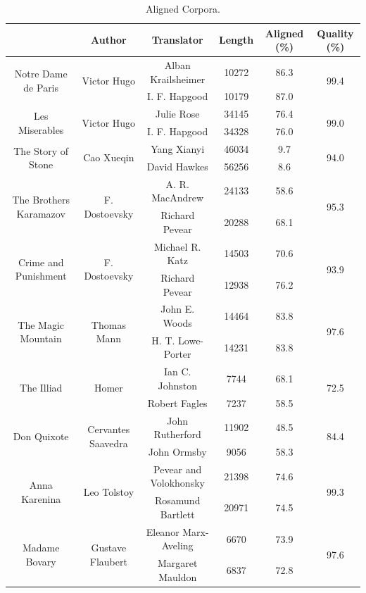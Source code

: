 \begin{table}[h!]\footnotesize
	\centering
	\small
	\begin{tabular}{|c|c|c|c|c|c|}
		\hline
		\textbf{\diagbox{Corpus}{Information}} & \textbf{Author} & \textbf{Translator} & \textbf{Length} & \textbf{Aligned (\%)} & \textbf{Quality (\%)} \\
		\hline
		\hline
		\multirow{2}{*}{Notre Dame de Paris} & \multirow{2}{*}{Victor Hugo} & Alban Krailsheimer & 10272 & 86.3 & \multirow{2}{*}{99.4} \\
		\cline{3-5} 
		& & I. F. Hapgood & 10179 & 87.0 & \\
		\hline
		\multirow{2}{*}{Les Miserables} & \multirow{2}{*}{Victor Hugo} & Julie Rose & 34145 & 76.4 & \multirow{2}{*}{99.0} \\
		\cline{3-5}
		& & I. F. Hapgood & 34328 & 76.0 & \\
		\hline
		\multirow{2}{*}{The Story of Stone} & \multirow{2}{*}{Cao Xueqin} & Yang Xianyi & 46034 & 9.7 & \multirow{2}{*}{94.0} \\
		\cline{3-5}
		& & David Hawkes & 56256 & 8.6 &  \\
		\hline
		\multirow{2}{*}{The Brothers Karamazov} & \multirow{2}{*}{F. Dostoevsky} & A. R. MacAndrew & 24133 & 58.6 & \multirow{2}{*}{95.3} \\
		\cline{3-5}
		& & Richard Pevear & 20288 & 68.1 & \\
		\hline
		\multirow{2}{*}{Crime and Punishment} & \multirow{2}{*}{F. Dostoevsky} & Michael R. Katz & 14503 & 70.6 & \multirow{2}{*}{93.9} \\
		\cline{3-5}
		& & Richard Pevear & 12938 & 76.2 & \\
		\hline
		\multirow{2}{*}{The Magic Mountain} & \multirow{2}{*}{Thomas Mann} & John E. Woods & 14464 & 83.8 & \multirow{2}{*}{97.6} \\
		\cline{3-5}
		& & H. T. Lowe-Porter & 14231 & 83.8 & \\
		\hline
		\multirow{2}{*}{The Illiad} & \multirow{2}{*}{Homer} & Ian C. Johnston & 7744 & 68.1 & \multirow{2}{*}{72.5} \\
		\cline{3-5}
		& & Robert Fagles & 7237 & 58.5 & \\
		\hline
		\multirow{2}{*}{Don Quixote} & \multirow{2}{*}{Cervantes Saavedra} & John Rutherford & 11902 & 48.5 & \multirow{2}{*}{84.4} \\
		\cline{3-5}
		& & John Ormsby & 9056 & 58.3 & \\
		\hline
		\multirow{2}{*}{Anna Karenina} & \multirow{2}{*}{Leo Tolstoy} & Pevear and Volokhonsky & 21398 & 74.6 & \multirow{2}{*}{99.3} \\
		\cline{3-5}
		& & Rosamund Bartlett & 20971 & 74.5 & \\
		\hline
		\multirow{2}{*}{Madame Bovary} & \multirow{2}{*}{Gustave Flaubert} & Eleanor Marx-Aveling & 6670 & 73.9 & \multirow{2}{*}{97.6} \\
		\cline{3-5}
		& & Margaret Mauldon & 6837 & 72.8 & \\
		\hline
	\end{tabular}
	\caption{Aligned Corpora.}\label{tb:6}
\end{table}

